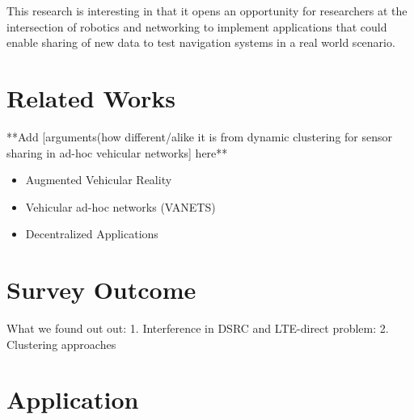 \documentclass{article}
\begin{document}
This research is interesting in that it opens an opportunity for researchers at the intersection of robotics and networking to implement applications that could enable sharing of new data to test navigation systems in a real world scenario.

\section{Related Works}

**Add [arguments(how different/alike it is from dynamic clustering for sensor sharing in ad-hoc vehicular networks] here**
\begin{itemize}
    \item Augmented Vehicular Reality
    \item Vehicular ad-hoc networks (VANETS)
    \item Decentralized Applications
\end{itemize}

\section{Survey Outcome}
What we found out out:
1. Interference in DSRC and LTE-direct problem:
2. Clustering approaches

\section{Application}
\end{document}
